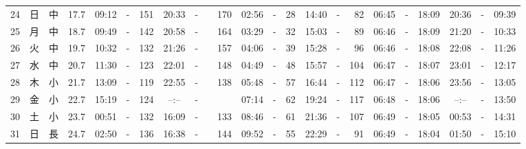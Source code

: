 \documentclass[12pt,a4j]{jsarticle}
\begin{document}
\begin{table}[htbp]
\begin{center}
{\begin{tabular}{|rc|cr|ccrccr|ccrccr|ccc|ccc|}
24 & 日 & 中 & 17.7 &  09:12 &-& 151 &  20:33 &-& 170 &  02:56 &-&  28 &  14:40 &-&  82 & 06:45 & -& 18:09 & 20:36 & -& 09:39 \\
25 & 月 & 中 & 18.7 &  09:49 &-& 142 &  20:58 &-& 164 &  03:29 &-&  32 &  15:03 &-&  89 & 06:46 & -& 18:09 & 21:20 & -& 10:33 \\
26 & 火 & 中 & 19.7 &  10:32 &-& 132 &  21:26 &-& 157 &  04:06 &-&  39 &  15:28 &-&  96 & 06:46 & -& 18:08 & 22:08 & -& 11:26 \\
27 & 水 & 中 & 20.7 &  11:30 &-& 123 &  22:01 &-& 148 &  04:49 &-&  48 &  15:57 &-& 104 & 06:47 & -& 18:07 & 23:01 & -& 12:17 \\
28 & 木 & 小 & 21.7 &  13:09 &-& 119 &  22:55 &-& 138 &  05:48 &-&  57 &  16:44 &-& 112 & 06:47 & -& 18:06 & 23:56 & -& 13:05 \\
29 & 金 & 小 & 22.7 &  15:19 &-& 124 &  --:-- &-&~~~~~ &  07:14 &-&  62 &  19:24 &-& 117 & 06:48 & -& 18:06 & --:-- & -& 13:50 \\
30 & 土 & 小 & 23.7 &  00:51 &-& 132 &  16:09 &-& 133 &  08:46 &-&  61 &  21:36 &-& 107 & 06:49 & -& 18:05 & 00:53 & -& 14:31 \\
31 & 日 & 長 & 24.7 &  02:50 &-& 136 &  16:38 &-& 144 &  09:52 &-&  55 &  22:29 &-&  91 & 06:49 & -& 18:04 & 01:50 & -& 15:10 \\
   \hline
   \end{tabular}}
   \end{center}
\end{table}
\newpage
\end{document}
